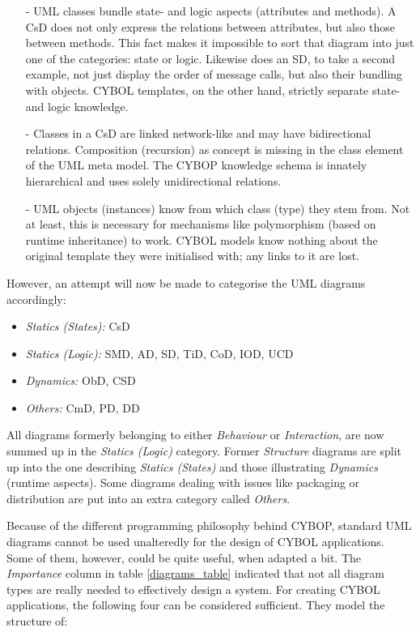 \begin{itemize}
    \item[-] UML classes bundle state- and logic aspects (attributes and
        methods). A CsD does not only express the relations between attributes,
        but also those between methods. This fact makes it impossible to sort
        that diagram into just one of the categories: state or logic. Likewise
        does an SD, to take a second example, not just display the order of
        message calls, but also their bundling with objects. CYBOL templates,
        on the other hand, strictly separate state- and logic knowledge.
    \item[-] Classes in a CsD are linked network-like and may have bidirectional
        relations. Composition (recursion) as concept is missing in the class
        element of the UML meta model. The CYBOP knowledge schema is innately
        hierarchical and uses solely unidirectional relations.
    \item[-] UML objects (instances) know from which class (type) they stem from.
        Not at least, this is necessary for mechanisms like polymorphism (based
        on runtime inheritance) to work. CYBOL models know nothing about the
        original template they were initialised with; any links to it are lost.
\end{itemize}

However, an attempt will now be made to categorise the UML diagrams accordingly:

\begin{itemize}
    \item \emph{Statics (States):} CsD
    \item \emph{Statics (Logic):} SMD, AD, SD, TiD, CoD, IOD, UCD
    \item \emph{Dynamics:} ObD, CSD
    \item \emph{Others:} CmD, PD, DD
\end{itemize}

All diagrams formerly belonging to either \emph{Behaviour} or \emph{Interaction},
are now summed up in the \emph{Statics (Logic)} category. Former \emph{Structure}
diagrams are split up into the one describing \emph{Statics (States)} and those
illustrating \emph{Dynamics} (runtime aspects). Some diagrams dealing with issues
like packaging or distribution are put into an extra category called \emph{Others}.

Because of the different programming philosophy behind CYBOP, standard UML
diagrams cannot be used unalteredly for the design of CYBOL applications. Some
of them, however, could be quite useful, when adapted a bit. The \emph{Importance}
column in table \ref{diagrams_table} indicated that not all diagram types are
really needed to effectively design a system. For creating CYBOL applications,
the following four can be considered sufficient. They model the structure of:


